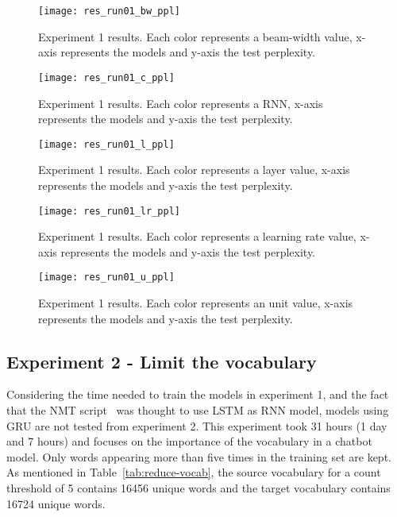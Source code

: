\begin{landscape}
\begin{figure}
    \centering
    \texttt{[image: res\_run01\_bw\_ppl]}
    \decoRule
    \caption[Results experiment 1 BW-PPL]{Experiment 1 results. Each color represents a beam-width value, x-axis represents the models and y-axis the test perplexity.}
    \label{fig:res_run01_bw_ppl}
\end{figure}
\begin{figure}
    \centering
    \texttt{[image: res\_run01\_c\_ppl]}
    \decoRule
    \caption[Results experiment 1 C-PPL]{Experiment 1 results. Each color represents a RNN, x-axis represents the models and y-axis the test perplexity.}
    \label{fig:res_run01_c_ppl}
\end{figure}
\begin{figure}
    \centering
    \texttt{[image: res\_run01\_l\_ppl]}
    \decoRule
    \caption[Results experiment 1 L-PPL]{Experiment 1 results. Each color represents a layer value, x-axis represents the models and y-axis the test perplexity.}
    \label{fig:res_run01_l_ppl}
\end{figure}
\begin{figure}
    \centering
    \texttt{[image: res\_run01\_lr\_ppl]}
    \decoRule
    \caption[Results experiment 1 LR-PPL]{Experiment 1 results. Each color represents a learning rate value, x-axis represents the models and y-axis the test perplexity.}
    \label{fig:res_run01_lr_ppl}
\end{figure}
\begin{figure}
    \centering
    \texttt{[image: res\_run01\_u\_ppl]}
    \decoRule
    \caption[Results experiment 1 U-PPL]{Experiment 1 results. Each color represents an unit value, x-axis represents the models and y-axis the test perplexity.}
    \label{fig:res_run01_u_ppl}
\end{figure}
\end{landscape}

\subsection{Experiment 2 - Limit the vocabulary}
Considering the time needed to train the models in experiment 1, and the fact that the NMT script~\citep{tensorflow.nmt} was thought to use LSTM as RNN model, models using GRU are not tested from experiment 2. This experiment took 31 hours (1 day and 7 hours) and focuses on the importance of the vocabulary in a chatbot model.
Only words appearing more than five times in the training set are kept. As mentioned in Table~\ref{tab:reduce-vocab}, the source vocabulary for a count threshold of 5 contains \num{16456} unique words and the target vocabulary contains \num{16724} unique words.

